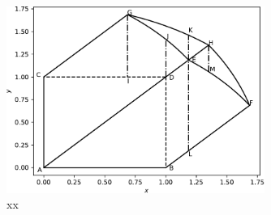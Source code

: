 \documentclass{article}
\theoremstyle{theorem}
\theoremstyle{definition}
\begin{document}
\begin{figure}[htb]
\centering
\includegraphics[width=0.75\textwidth]{sphere_xy.pdf}
\caption{xx}
\label{fig:prismatoid_solid}
\end{figure}




\end{document}

